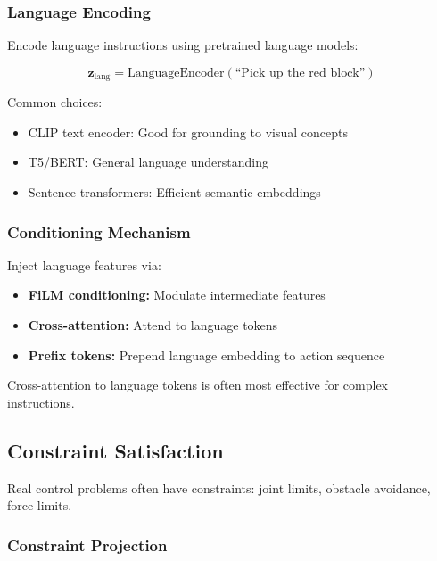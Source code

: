 \subsubsection{Language Encoding}

Encode language instructions using pretrained language models:

\begin{equation}
\mathbf{z}_{\text{lang}} = \text{LanguageEncoder}(\text{``Pick up the red block''})
\label{eq:language_encoding}
\end{equation}

Common choices:
\begin{itemize}
    \item CLIP text encoder: Good for grounding to visual concepts
    \item T5/BERT: General language understanding
    \item Sentence transformers: Efficient semantic embeddings
\end{itemize}

\subsubsection{Conditioning Mechanism}

Inject language features via:
\begin{itemize}
    \item \textbf{FiLM conditioning:} Modulate intermediate features
    \item \textbf{Cross-attention:} Attend to language tokens
    \item \textbf{Prefix tokens:} Prepend language embedding to action sequence
\end{itemize}

Cross-attention to language tokens is often most effective for complex instructions.

\subsection{Constraint Satisfaction}
\label{subsec:constraint_satisfaction}

Real control problems often have constraints: joint limits, obstacle avoidance, force limits.

\subsubsection{Constraint Projection}

